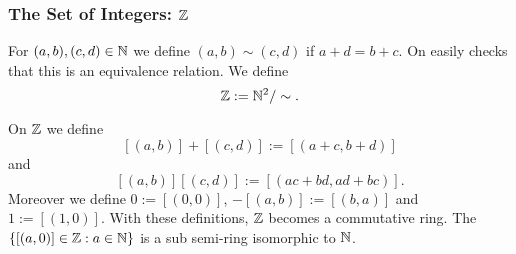 \subsubsection{The Set of Integers: $\mathbb{Z}$}
    \begin{definition}
        For $(a,b),(c,d)\in \mathbb{N}$ we define $(a,b)\sim (c,d)$ if $a+d=b+c$. On easily checks that this is an equivalence relation. We define 
        $$\mathbb{Z} := \mathbb{N}^2/\sim.$$
    \end{definition}
    \begin{proposition}
        On $\mathbb{Z}$ we define
        $$[(a,b)]+[(c,d)] := [(a+c,b+d)]$$
        and 
        $$[(a,b)][(c,d)] := [(ac+bd,ad+bc)].$$
        Moreover we define $0:=[(0,0)]$, $-[(a,b)]:=[(b,a)]$ and $1:= [(1,0)]$. With these definitions, $\mathbb{Z}$ becomes a commutative ring. The $\{[(a,0)]\in \mathbb{Z} :a\in \mathbb{N}\}$ is a sub semi-ring isomorphic to $\mathbb{N}$.
    \end{proposition}
